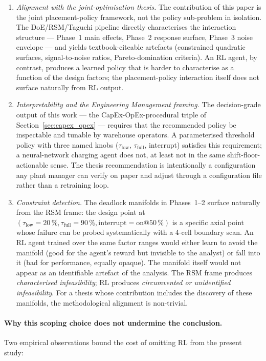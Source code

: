\documentclass[conference]{IEEEtran}
\begin{document}
\begin{enumerate}
  \item \emph{Alignment with the joint-optimisation thesis.} The contribution of this paper is the joint placement-policy framework, not the policy sub-problem in isolation. The DoE/RSM/Taguchi pipeline directly characterises the interaction structure --- Phase~1 main effects, Phase~2 response surface, Phase~3 noise envelope --- and yields textbook-citeable artefacts (constrained quadratic surfaces, signal-to-noise ratios, Pareto-domination criteria). An RL agent, by contrast, produces a learned policy that is harder to characterise as a function of the design factors; the placement-policy interaction itself does not surface naturally from RL output.
  \item \emph{Interpretability and the Engineering Management framing.} The decision-grade output of this work --- the CapEx-OpEx-procedural triple of Section~\ref{sec:capex_opex} --- requires that the recommended policy be inspectable and tunable by warehouse operators. A parameterised threshold policy with three named knobs ($\tau_\text{low}$, $\tau_\text{full}$, interrupt) satisfies this requirement; a neural-network charging agent does not, at least not in the same shift-floor-actionable sense. The thesis recommendation is intentionally a configuration any plant manager can verify on paper and adjust through a configuration file rather than a retraining loop.
  \item \emph{Constraint detection.} The deadlock manifolds in Phases~1--2 surface naturally from the RSM frame: the design point at $(\tau_\text{low}=20\,\%, \tau_\text{full}=90\,\%, \text{interrupt}=\text{on}@50\,\%)$ is a specific axial point whose failure can be probed systematically with a 4-cell boundary scan. An RL agent trained over the same factor ranges would either learn to avoid the manifold (good for the agent's reward but invisible to the analyst) or fall into it (bad for performance, equally opaque). The manifold itself would not appear as an identifiable artefact of the analysis. The RSM frame produces \emph{characterised infeasibility}; RL produces \emph{circumvented or unidentified infeasibility}. For a thesis whose contribution includes the discovery of these manifolds, the methodological alignment is non-trivial.
\end{enumerate}

\paragraph{Why this scoping choice does not undermine the conclusion.}
Two empirical observations bound the cost of omitting RL from the present study:
\end{document}
